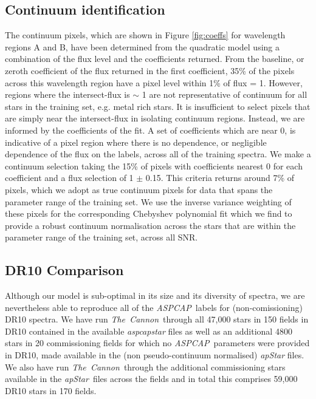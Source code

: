 \documentclass[12pt, preprint]{aastex}
\newcommand{\tc}{\textsl{The~Cannon}}
\newcommand{\apogee}{\textsl{APOGEE}}
\newcommand{\aspcap}{\textsl{ASPCAP}}
\newcommand{\apstar}{\textsl{apStar}}
\begin{document}
\subsection{Continuum identification}

The continuum pixels, which are shown in Figure \ref{fig:coeffs} for wavelength regions A and B,  have been determined from the quadratic model using a combination of the flux level and the coefficients returned.  From the baseline, or zeroth coefficient of the flux returned in the first coefficient, 35\% of the pixels across this wavelength region have a pixel level within 1\% of flux = 1. However, regions where the intersect-flux is $\sim$ 1 are not representative of continuum for all stars in the training set, e.g. metal rich stars. It is insufficient to select pixels that are simply near the intersect-flux in isolating continuum regions. Instead, we are informed by the coefficients of the fit. A set of coefficients which are near 0, is indicative of a pixel region where there is no dependence, or negligible dependence of the flux on the labels, across all of the training spectra. We make a continuum selection taking the 15\% of pixels with coefficients nearest 0 for each coefficient and a flux selection of 1 $\pm$ 0.15. This criteria returns around  7\% of pixels, which we adopt as true continuum pixels for data that spans the parameter range of the training set. We use the inverse variance weighting of these pixels for the corresponding Chebyshev polynomial fit which we find to provide a robust continuum normalisation across the stars that are within the parameter range of the training set, across all SNR. 

\subsection{DR10 Comparison}

Although our model is sub-optimal in its size and its diversity of spectra, we are nevertheless able to reproduce all of the \aspcap\ labels for (non-comissioning) DR10 spectra. We have run \tc\ through all 47,000 stars in 150 fields in DR10 contained in the available \textit{aspcapstar} files as well as an additional 4800 stars in 20 commissioning fields for which no \aspcap\ parameters were provided in DR10, made available in the (non pseudo-continuum normalised) \textit{apStar} files. We also have run \tc\ through the additional commissioning stars available in the \apstar\ files across the fields and in total this comprises 59,000 DR10 stars in 170 fields. %
\end{document}
